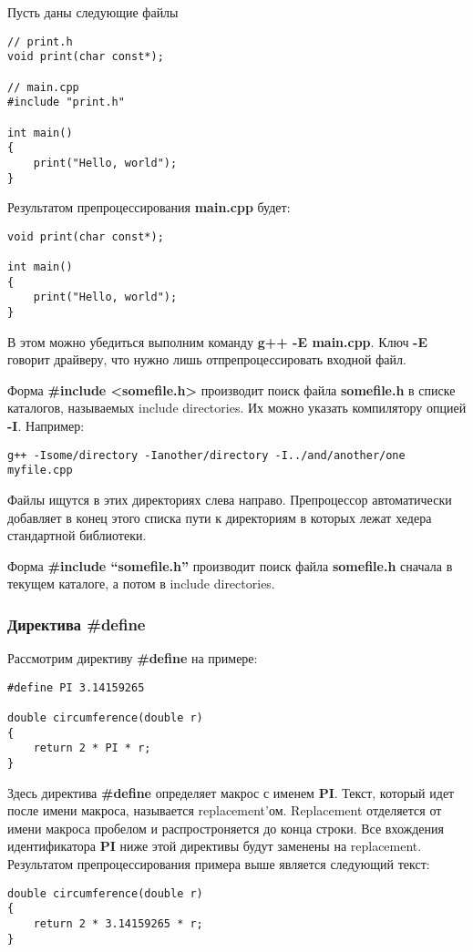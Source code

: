 Пусть даны следующие файлы
\begin{verbatim}
// print.h
void print(char const*);

// main.cpp
#include "print.h"

int main()
{
    print("Hello, world");
}
\end{verbatim}
Результатом препроцессирования {\bf main.cpp} будет:
\begin{verbatim}
void print(char const*);

int main()
{
    print("Hello, world");
}
\end{verbatim}
В этом можно убедиться выполним команду {\bf g++ -E main.cpp}. Ключ {\bf -E} говорит драйверу, что нужно лишь отпрепроцессировать входной файл.

Форма {\bf \#include <somefile.h>} производит поиск файла {\bf somefile.h} в списке каталогов, называемых include directories. Их можно указать компилятору опцией {\bf -I}. Например:
\begin{verbatim}
g++ -Isome/directory -Ianother/directory -I../and/another/one myfile.cpp
\end{verbatim}
Файлы ищутся в этих директориях слева направо. Препроцессор автоматически добавляет в конец этого списка пути к директориям в которых лежат хедера стандартной библиотеки.

Форма {\bf \#include ``somefile.h''} производит поиск файла {\bf somefile.h} сначала в текущем каталоге, а потом в include directories.

\subsubsection{Директива \#define}

Рассмотрим директиву {\bf \#define} на примере:
\begin{verbatim}
#define PI 3.14159265

double circumference(double r)
{
    return 2 * PI * r;
}
\end{verbatim}
Здесь директива {\bf \#define} определяет макрос с именем {\bf PI}. Текст, который идет после имени макроса, называется replacement'ом. Replacement отделяется от имени макроса пробелом и распростроняется до конца строки. Все вхождения идентификатора {\bf PI} ниже этой директивы будут заменены на replacement. Результатом препроцессирования примера выше является следующий текст:
\begin{verbatim}
double circumference(double r)
{
    return 2 * 3.14159265 * r;
}
\end{verbatim}


